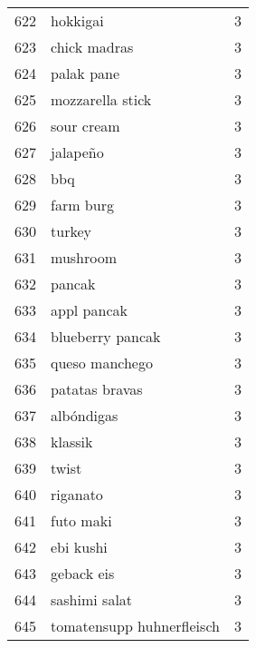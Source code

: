 \begin{tabular}{llr}
622  &                                           hokkigai &      3 \\
623  &                                       chick madras &      3 \\
624  &                                         palak pane &      3 \\
625  &                                   mozzarella stick &      3 \\
626  &                                         sour cream &      3 \\
627  &                                           jalapeño &      3 \\
628  &                                                bbq &      3 \\
629  &                                          farm burg &      3 \\
630  &                                             turkey &      3 \\
631  &                                           mushroom &      3 \\
632  &                                             pancak &      3 \\
633  &                                        appl pancak &      3 \\
634  &                                   blueberry pancak &      3 \\
635  &                                     queso manchego &      3 \\
636  &                                     patatas bravas &      3 \\
637  &                                         albóndigas &      3 \\
638  &                                            klassik &      3 \\
639  &                                              twist &      3 \\
640  &                                           riganato &      3 \\
641  &                                          futo maki &      3 \\
642  &                                          ebi kushi &      3 \\
643  &                                         geback eis &      3 \\
644  &                                      sashimi salat &      3 \\
645  &                          tomatensupp huhnerfleisch &      3 \\

\end{tabular}
